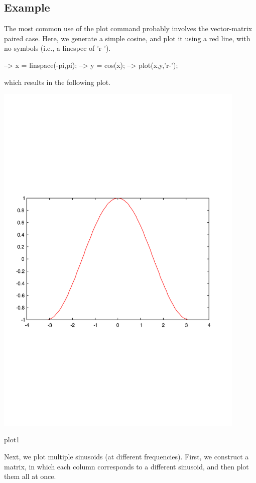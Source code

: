  \hypertarget{variables_struct_Example}{}\subsection{Example}\label{variables_struct_Example}
The most common use of the {\ttfamily plot} command probably involves the vector-\/matrix paired case. Here, we generate a simple cosine, and plot it using a red line, with no symbols (i.\-e., a {\ttfamily linespec} of {\ttfamily 'r-\/'}).


\begin{DoxyVerbInclude}
--> x = linspace(-pi,pi);
--> y = cos(x);
--> plot(x,y,'r-');
\end{DoxyVerbInclude}


which results in the following plot.  
\begin{DoxyImage}
\includegraphics[width=12cm]{plot1}
\caption{plot1}
\end{DoxyImage}


Next, we plot multiple sinusoids (at different frequencies). First, we construct a matrix, in which each column corresponds to a different sinusoid, and then plot them all at once.


